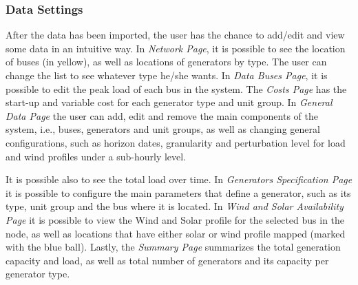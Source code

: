 \documentclass[12pt,LUDisStyle,twosided]{book}
\begin{document}
\newpage
\subsubsection{Data Settings}

After the data has been imported, the user has the chance to add/edit and view some data in an intuitive way. In \textit{Network Page}, it is possible to see the location of buses (in yellow), as well as locations of generators by type. The user can change the list to see whatever type he/she wants. In \textit{Data Buses Page}, it is possible to edit the peak load of each bus in the system. The \textit{Costs Page} has the start-up and variable cost for each generator type and unit group. In \textit{General Data Page} the user can add, edit and remove the main components of the system, i.e., buses, generators and unit groups, as well as changing general configurations, such as horizon dates, granularity and perturbation level for load and wind profiles under a sub-hourly level. 

It is possible also to see the total load over time. In \textit{Generators Specification Page} it is possible to configure the main parameters that define a generator, such as its type, unit group and the bus where it is located. In \textit{Wind and Solar Availability Page} it is possible to view the Wind and Solar profile for the selected bus in the node, as well as locations that have either solar or wind profile mapped (marked with the blue ball). Lastly, the \textit{Summary Page} summarizes the total generation capacity and load, as well as total number of generators and its capacity per generator type.
\end{document}
